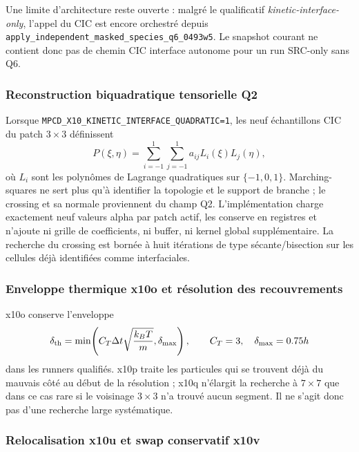 \documentclass[11pt,a4paper]{article}
\begin{document}
Une limite d'architecture reste ouverte : malgré le qualificatif \emph{kinetic-interface-only}, l'appel du CIC est encore orchestré depuis \texttt{apply\_independent\_masked\_species\_q6\_0493w5}. Le snapshot courant ne contient donc pas de chemin CIC interface autonome pour un run SRC-only sans Q6.

\subsubsection{Reconstruction biquadratique tensorielle Q2}

Lorsque
\texttt{MPCD\_X10\_KINETIC\_INTERFACE\_QUADRATIC=1},
les neuf échantillons CIC du patch $3\times3$ définissent
\begin{equation}
  P(\xi,\eta)
  =
  \sum_{i=-1}^{1}\sum_{j=-1}^{1}
  a_{ij}L_i(\xi)L_j(\eta),
  \label{eq:x10_q2}
\end{equation}
où $L_i$ sont les polynômes de Lagrange quadratiques sur $\{-1,0,1\}$. Marching-squares ne sert plus qu'à identifier la topologie et le support de branche ; le crossing et sa normale proviennent du champ Q2. L'implémentation charge exactement neuf valeurs alpha par patch actif, les conserve en registres et n'ajoute ni grille de coefficients, ni buffer, ni kernel global supplémentaire. La recherche du crossing est bornée à huit itérations de type sécante/bisection sur les cellules déjà identifiées comme interfaciales.

\subsubsection{Enveloppe thermique x10o et résolution des recouvrements}

x10o conserve l'enveloppe
\begin{equation}
  \delta_{\rm th}
  =
  \min\!\left(
      C_T\Delta t\sqrt{\frac{k_BT}{m}},
      \delta_{\max}
  \right),
  \qquad
  C_T=3,\quad \delta_{\max}=0.75h
  \label{eq:x10o_thermal_envelope_current}
\end{equation}
dans les runners qualifiés. x10p traite les particules qui se trouvent déjà du mauvais côté au début de la résolution ; x10q n'élargit la recherche à $7\times7$ que dans ce cas rare si le voisinage $3\times3$ n'a trouvé aucun segment. Il ne s'agit donc pas d'une recherche large systématique.

\subsubsection{Relocalisation x10u et swap conservatif x10v}
\end{document}
